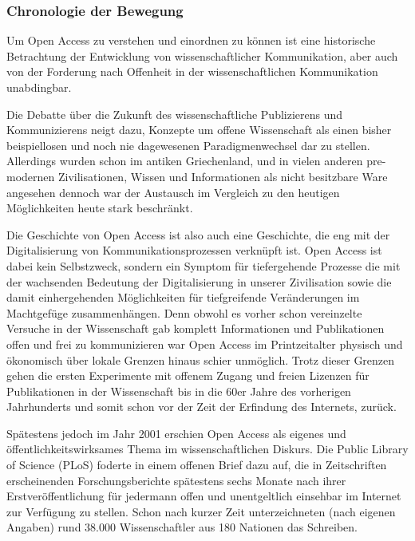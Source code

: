 \subsubsection{Chronologie der Bewegung}
Um Open Access zu verstehen und einordnen zu können ist eine historische Betrachtung der Entwicklung von wissenschaftlicher Kommunikation, aber auch von der Forderung nach Offenheit in der wissenschaftlichen Kommunikation unabdingbar. 

Die Debatte über die Zukunft des wissenschaftliche Publizierens und Kommunizierens neigt dazu, Konzepte um offene Wissenschaft als einen bisher beispiellosen und noch nie dagewesenen Paradigmenwechsel dar zu stellen\cite{cite:17a}\cite{cite:17b}. Allerdings wurden schon im antiken Griechenland, und in vielen anderen pre-modernen Zivilisationen, Wissen und Informationen als nicht besitzbare Ware angesehen\cite{cite:18} dennoch war der Austausch im Vergleich zu den heutigen Möglichkeiten heute stark beschränkt\cite{cite:17c}.

Die Geschichte von Open Access ist also auch eine Geschichte, die eng mit der Digitalisierung von Kommunikationsprozessen verknüpft ist. Open Access ist dabei kein Selbstzweck\cite{cite:17d}, sondern ein Symptom für tiefergehende Prozesse die mit der wachsenden Bedeutung der Digitalisierung in unserer Zivilisation sowie die damit einhergehenden Möglichkeiten für tiefgreifende Veränderungen im Machtgefüge zusammenhängen\cite{cite:17e}. Denn obwohl es vorher schon vereinzelte Versuche in der Wissenschaft gab komplett Informationen und Publikationen offen und frei zu kommunizieren war Open Access im Printzeitalter physisch und ökonomisch über lokale Grenzen hinaus schier unmöglich\cite{cite:18a}. Trotz dieser Grenzen gehen die ersten Experimente mit offenem Zugang und freien Lizenzen für Publikationen in der Wissenschaft bis in die 60er Jahre des vorherigen Jahrhunderts und somit schon vor der Zeit der Erfindung des Internets, zurück\cite{cite:18b}.

Spätestens jedoch im Jahr 2001 erschien Open Access als eigenes und öffentlichkeitswirksames Thema im wissenschaftlichen Diskurs\cite{cite:19}. Die Public Library of Science (PLoS) foderte in einem offenen Brief\cite{cite:20} dazu auf, die in Zeitschriften erscheinenden Forschungsberichte spätestens sechs Monate nach ihrer Erstveröffentlichung für jedermann offen und unentgeltlich einsehbar im Internet zur Verfügung zu stellen. Schon nach kurzer Zeit unterzeichneten (nach eigenen Angaben\cite{cite:19a}) rund 38.000 Wissenschaftler aus 180 Nationen das Schreiben.

